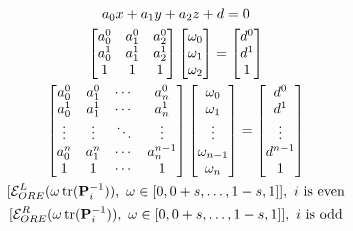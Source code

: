 \documentclass[letterpaper, 10 pt, conference]{ieeeconf}  %
\begin{document}
\begin{gather}
   a_0x + a_1y +a_2z + d = 0 \\
   \begin{bmatrix}
      a_0^0 & a_1^0 & a_2^0 \\
      a_0^1 & a_1^1 & a_2^1 \\
      1 & 1 & 1
   \end{bmatrix}
   \begin{bmatrix}
      \omega_0 \\
      \omega_1 \\
      \omega_2
   \end{bmatrix}
   =
   \begin{bmatrix}
      d^0 \\
      d^1 \\
      1
   \end{bmatrix} \\
   \begin{bmatrix}
      a_0^0 & a_1^0 & \cdots & a_n^0 \\
      a_0^1 & a_1^1 & \cdots & a_n^1 \\
      \vdots & \vdots & \ddots & \vdots \\
      a_0^n & a_1^n & \cdots & a_n^{n-1} \\
      1 & 1 & \cdots & 1
   \end{bmatrix}
   \begin{bmatrix}
      \omega_0 \\
      \omega_1 \\
      \vdots \\
      \omega_{n-1} \\
      \omega_n
   \end{bmatrix}
   =
   \begin{bmatrix}
      d^0 \\
      d^1 \\
      \vdots \\
      d^{n-1} \\
      1
   \end{bmatrix} \\
   [\mathcal{E}^L_{ORE}(\omega\tr(\mP^{-1}_i)),\ \omega \in [0,0+s,\dots,1-s,1]],\ i\text{ is even} \\
   [\mathcal{E}^R_{ORE}(\omega\tr(\mP^{-1}_i)),\ \omega \in [0,0+s,\dots,1-s,1]],\ i\text{ is odd}
\end{gather}

\end{document}

